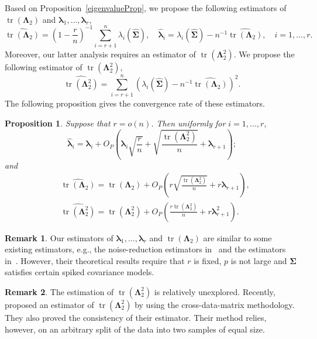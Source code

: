 \documentclass[12pt]{article} %
\DeclareMathOperator{\mytr}{tr}
\newcommand{\bZ}{\mathbf{Z}}
\newcommand{\bfsym}[1]{\ensuremath{\boldsymbol{#1}}}
\def\blambda {\bfsym {\lambda}}
\def\bLambda {\bfsym {\Lambda}}
\def\bSigma {\bfsym {\Sigma}}
\newtheorem{proposition}{Proposition}
\theoremstyle{definition}
\newtheorem{remark}{Remark}
\begin{document}
Based on Proposition~\ref{eigenvalueProp}, we propose the following estimators of  $\mytr(\bLambda_2)$ and $\blambda_1,\ldots,\blambda_r$,
\begin{equation*}
    \widehat{\mytr(\bLambda_2)}=\left(1-\frac{r}{n}\right)^{-1}\sum_{i=r+1}^n \lambda_i (\hat{\bSigma})
    ,\quad
    \hat{\blambda}_i=\lambda_i(\hat{\bSigma})-n^{-1}\widehat{\mytr(\bLambda_2)},\quad i=1,\ldots,r.
\end{equation*}
Moreover, our latter analysis requires an estimator of $\mytr(\bLambda_2^2)$.
We propose the following estimator of $\mytr(\bLambda_2^2)$,
\begin{equation*}
    \widehat{\mytr(\bLambda_2^2)}=\sum_{i=r+1}^n \left(\lambda_i(\hat{\bSigma})-n^{-1}\widehat{\mytr(\bLambda_2)}\right)^2.
\end{equation*}
The following proposition gives the convergence rate of these estimators.
\begin{proposition}
    \label{eigenvalueProp:R3}
    Suppose that $r=o(n)$.
    Then uniformly for $i=1,\ldots, r$, 
\begin{equation*}
    \hat{\blambda}_i
        =
        \blambda_i
        +O_P\left(\blambda_i \sqrt{\frac{r}{n}}+\sqrt{\frac{\mytr(\bLambda_2^2)}{ n}}+\blambda_{r+1}\right);
\end{equation*}
and
\begin{align*}
    &\widehat{\mytr(\bLambda_2)}=\mytr(\bLambda_2) + O_P\left(r\sqrt{\frac{\mytr(\bLambda_2^2)}{n}}+r\blambda_{r+1}\right),
        \\
&\widehat{\mytr(\bLambda_2^2)}
        =
         \mytr(\bLambda_2^2)
        +
        O_P\left(\frac{r \mytr(\bLambda_2^2)}{n} + r  \blambda_{r+1}^2\right).
\end{align*}
\end{proposition}
\begin{remark}
    Our estimators of $\blambda_1,\ldots, \blambda_r$ and $\mytr(\bLambda_2)$ are similar to some existing estimators, e.g., the noise-reduction estimators in~\cite{YATA2012193} and the estimators in~\cite{wang2017As}.
    However, their theoretical results require that $r$ is fixed, $p$ is not large and $\bSigma$ satisfies certain spiked covariance models.
\end{remark}

\begin{remark}
    The estimation of $\mytr(\bLambda_2^2)$ is relatively unexplored.
    Recently, \cite{Aoshima2018} proposed an estimator of $\mytr(\bLambda_2^2)$ by using the cross-data-matrix methodology.
    They also proved the consistency of their estimator.
    Their method relies, however,  on an arbitrary split of the data into two samples of equal size.
\end{remark}
\end{document}
